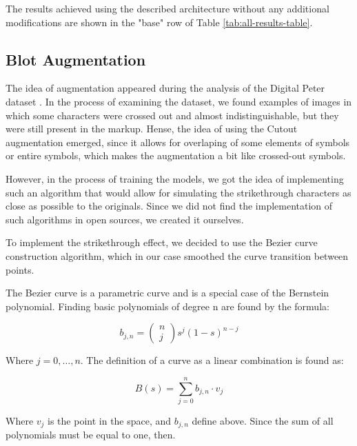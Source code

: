 \documentclass[10pt,twocolumn,letterpaper]{article}
\begin{document}
The results achieved using the described architecture without any additional modifications are shown in the "base" row of Table \ref{tab:all-results-table}. 





\subsection{Blot Augmentation}

The idea of augmentation appeared during the analysis of the Digital Peter dataset \cite{complink,potanin2021digital}. In the process of examining the dataset, we found examples of images in which some characters were crossed out and almost indistinguishable, but they were still present in the markup. Hense, the idea of using the Cutout augmentation \cite{devries2017improved} emerged, since it allows for overlaping of some elements of symbols or entire symbols, which makes the augmentation a bit like crossed-out symbols.






However, in the process of training the models, we got the idea of implementing such an algorithm that would allow for simulating the strikethrough characters as close as possible to the originals. Since we did not find the implementation of such algorithms in open sources, we created it ourselves.

To implement the strikethrough effect, we decided to use the Bezier curve construction algorithm, which in our case smoothed the curve transition between points.

The Bezier curve is a parametric curve and is a special case of the Bernstein polynomial. Finding basic polynomials of degree n are found by the formula:

\begin{equation}\label{eq4}
{b_{j,n}}=\left(\begin{array}{c}n\\j\end{array}\right)s^j\left(1-s\right)^{n-j}
\end{equation}

 Where $j=0,\dots ,n$. The definition of a curve as a linear combination is found as:

\begin{equation}\label{eq5}
B(s)=\sum_{j=0}^nb_{j,n}\cdot{v_j}
\end{equation}

Where $v_{j}$ is the point in the space, and $b_{j, n}$ define above. Since the sum of all polynomials must be equal to one, then.
\end{document}
